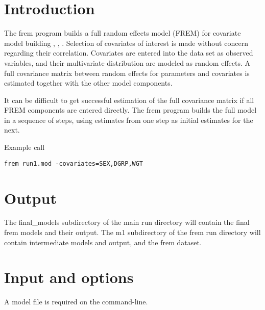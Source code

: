 
\usepackage{amsmath}


\newcommand{\guidetoolname}{frem}

\maketitle

\section{Introduction}
The frem program builds a full random effects model (FREM) for covariate model building
 \cite{Karlsson}, \cite{Ivaturi}, \cite{Yun}.
Selection of covariates of interest is made without concern regarding their correlation.
Covariates are entered into the data set as observed variables, and their multivariate distribution are modeled
as random effects. A full covariance matrix between random effects for parameters and covariates is estimated
together with the other model components.

It can be difficult to get successful estimation of the full covariance matrix
if all FREM components are entered directly. The frem program builds the
full model in a sequence of steps,
using estimates from one step as initial estimates for the next.

Example call
\begin{verbatim}
frem run1.mod -covariates=SEX,DGRP,WGT
\end{verbatim}

\section{Output}
The final\_models subdirectory of the main run directory
will contain the final frem models and their output.
The m1 subdirectory of the frem run directory will contain intermediate models and output,
and the frem dataset.

\section{Input and options}
A model file is required on the command-line.


